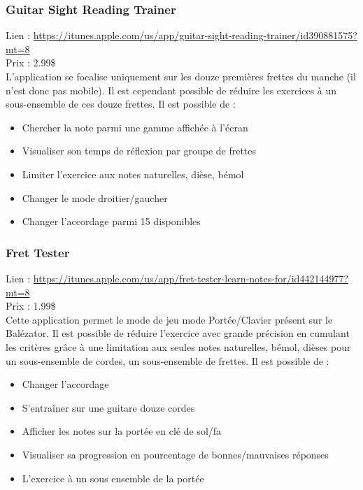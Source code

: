 \documentclass{scrreprt}
\begin{document}
\subsubsection{Guitar Sight Reading Trainer}
Lien :  \url{ https://itunes.apple.com/us/app/guitar-sight-reading-trainer/id390881575?mt=8 }\\
Prix : 2.99\$\\
L’application se focalise uniquement sur les douze premières frettes du manche (il n’est donc pas mobile). Il est cependant possible de réduire les exercices à un sous-ensemble de ces douze frettes. 
Il est possible de :
\begin{itemize}
\item Chercher la note parmi une gamme affichée à l’écran
\item Visualiser son temps de réflexion par groupe de frettes
\item Limiter l'exercice aux notes naturelles, dièse, bémol
\item Changer le mode droitier/gaucher
\item Changer l’accordage parmi 15 disponibles
\end{itemize}

\newpage

\subsubsection{Fret Tester}
Lien :  \url{https://itunes.apple.com/us/app/fret-tester-learn-notes-for/id442144977?mt=8}\\
Prix : 1.99\$\\
Cette application permet le mode de jeu mode Portée/Clavier présent sur le Balézator.
Il est possible de réduire l’exercice avec grande précision en cumulant les critères grâce à une limitation aux seules notes naturelles, bémol, dièses pour un sous-ensemble de cordes, un sous-ensemble de frettes.
Il est possible de :
\begin{itemize}
\item Changer l’accordage
\item S'entraîner sur une guitare douze cordes
\item Afficher les notes sur la portée en clé de sol/fa
\item Visualiser sa progression en pourcentage de bonnes/mauvaises réponses
\item L'exercice à un sous ensemble de la portée
\end{itemize}
\end{document}
